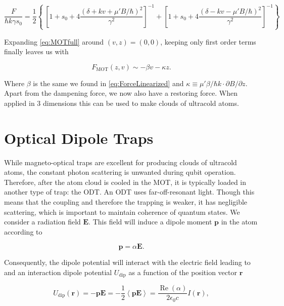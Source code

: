 \begin{equation}\label{eq:MOTfull}
	\frac{F}{\hbar k \gamma s_0} = \frac{1}{2}\left\{\
	\left[1 + s_0 + 4\frac{(\delta+kv+\mu'B/\hbar)^2}{\gamma^2}\right]^{-1}+
	\left[1 + s_0 + 4\frac{(\delta-kv-\mu'B/\hbar)^2}{\gamma^2}\right]^{-1}
	\right\}
\end{equation}

Expanding \cref{eq:MOTfull} around $(v,z) = (0,0)$, keeping only first order terms finally leaves us with \cite{Kowalski2010}

\begin{equation}\label{eq:ForceMOT}
	F_{\text{MOT}}(z,v) \sim -\beta v - \kappa z.
\end{equation}

Where $\beta$ is the same we found in \cref{eq:ForceLinearized} and $\kappa \equiv \mu' \beta /\hbar k \cdot \partial B/\partial z$. 
Apart from the dampening force, we now also have a restoring force. 
When applied in 3 dimensions this can be used to make clouds of ultracold atoms. 

\section{Optical Dipole Traps}\label{sec:OpticalDipoleTrap}

While magneto-optical traps are excellent for producing clouds of ultracold atoms, the constant photon scattering is unwanted during qubit operation. 
Therefore, after the atom cloud is cooled in the \ac{MOT}, it is typically loaded in another type of trap: the \ac{ODT}. 
An ODT uses far-off-resonant light. Though this means that the coupling and therefore the trapping is weaker, it has negligible scattering, which is important to maintain coherence of quantum states. 
We consider a radiation field $\mathbf{E}$. 
This field will induce a dipole moment $\mathbf{p}$ in the atom according to 
	
\begin{equation}\label{eq:DipoleMoment}
	\mathbf{p} = \alpha \mathbf{E}.
\end{equation}

Consequently, the dipole potential will interact with the electric field leading to and an interaction dipole potential $U_{\text{dip}}$ as a function of the position vector $\mathbf{r}$ \cite{Grimm2000}

\begin{equation}\label{eq:DipolePotential}
	U_{\text{dip}}(\mathbf{r}) = -\mathbf{p}\mathbf{E} = 
	-\frac{1}{2} \left\langle \mathbf{p}\mathbf{E} \right\rangle = \frac{\operatorname{Re}(\alpha)}{2\epsilon_0 c} I(\mathbf{r}),
\end{equation}

